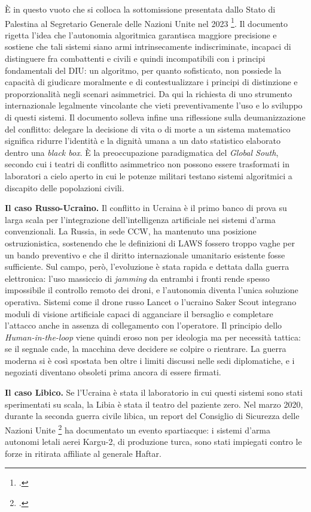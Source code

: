 \documentclass[a4paper,12pt]{report}
\begin{document}
È in questo vuoto che si colloca la sottomissione presentata dallo Stato di
Palestina al Segretario Generale delle Nazioni Unite nel 2023
\footcite{palestine_2023}. Il documento rigetta l'idea che l'autonomia
algoritmica garantisca maggiore precisione e sostiene che tali sistemi siano
armi intrinsecamente indiscriminate, incapaci di distinguere fra combattenti e
civili e quindi incompatibili con i principi fondamentali del DIU: un algoritmo,
per quanto sofisticato, non possiede la capacità di giudicare moralmente e di
contestualizzare i principi di distinzione e proporzionalità negli scenari
asimmetrici. Da qui la richiesta di uno strumento internazionale legalmente
vincolante che vieti preventivamente l'uso e lo sviluppo di questi sistemi. Il
documento solleva infine una riflessione sulla deumanizzazione del conflitto:
delegare la decisione di vita o di morte a un sistema matematico significa
ridurre l'identità e la dignità umana a un dato statistico elaborato dentro una
\textit{black box}. È la preoccupazione paradigmatica del \textit{Global South},
secondo cui i teatri di conflitto asimmetrico non possono essere trasformati in
laboratori a cielo aperto in cui le potenze militari testano sistemi algoritmici
a discapito delle popolazioni civili.
 
\textbf{Il caso Russo-Ucraino.}
Il conflitto in Ucraina è il primo banco di prova su larga scala per
l'integrazione dell'intelligenza artificiale nei sistemi d'arma convenzionali.
La Russia, in sede CCW, ha mantenuto una posizione ostruzionistica, sostenendo
che le definizioni di LAWS fossero troppo vaghe per un bando preventivo e che il
diritto internazionale umanitario esistente fosse sufficiente. Sul campo, però,
l'evoluzione è stata rapida e dettata dalla guerra elettronica: l'uso massiccio
di \textit{jamming} da entrambi i fronti rende spesso impossibile il controllo
remoto dei droni, e l'autonomia diventa l'unica soluzione operativa. Sistemi
come il drone russo Lancet o l'ucraino Saker Scout integrano moduli di visione
artificiale capaci di agganciare il bersaglio e completare l'attacco anche in
assenza di collegamento con l'operatore. Il principio dello
\textit{Human-in-the-loop} viene quindi eroso non per ideologia ma per necessità
tattica: se il segnale cade, la macchina deve decidere se colpire o rientrare.
La guerra moderna si è così spostata ben oltre i limiti discussi nelle sedi
diplomatiche, e i negoziati diventano obsoleti prima ancora di essere firmati.
 
\textbf{Il caso Libico.}
Se l'Ucraina è stata il laboratorio in cui questi sistemi sono stati sperimentati
su scala, la Libia è stata il teatro del paziente zero. Nel marzo 2020, durante
la seconda guerra civile libica, un report del Consiglio di Sicurezza delle
Nazioni Unite \footcite{un_libya_2021} ha documentato un evento spartiacque: i
sistemi d'arma autonomi letali aerei Kargu-2, di produzione turca, sono stati
impiegati contro le forze in ritirata affiliate al generale Haftar.
 
\end{document}
